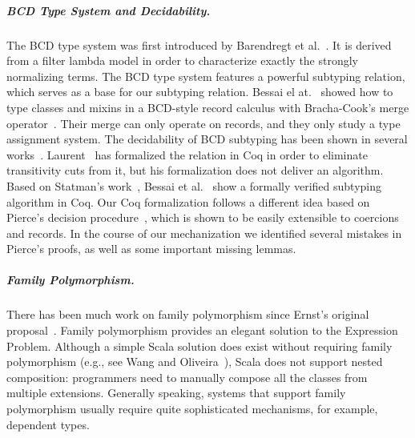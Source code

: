\subparagraph{BCD Type System and Decidability.}
The BCD type system was first introduced by Barendregt et al.~\cite{Barendregt_1983}. It is
derived from a filter lambda model in order to characterize exactly the strongly
normalizing terms. The BCD type system features a powerful subtyping relation,
which serves as a base for our subtyping relation. Bessai el at.~\cite{DBLP:journals/corr/BessaiDDCd15}
showed how to type classes and mixins in a BCD-style record calculus with Bracha-Cook's merge operator~\cite{bracha1990mixin}.
Their merge can only operate on records, and they only study a type assignment system.
The decidability of BCD subtyping has been shown in several
works~\cite{pierce1989decision, Kurata_1995, Rehof_2011, Statman_2015}.
Laurent~\cite{laurent2012intersection} has formalized the relation in Coq in
order to eliminate transitivity cuts from it, but his formalization does not
deliver an algorithm. Based on Statman's work~\cite{Statman_2015}, Bessai et
al.~\cite{bessaiextracting} show a formally verified subtyping algorithm in Coq.
Our Coq formalization follows a different idea based on Pierce's decision
procedure~\cite{pierce1989decision}, which is shown to be easily extensible to
coercions and records. In the course of our mechanization we identified several
mistakes in Pierce's proofs, as well as some important missing lemmas.

\subparagraph{Family Polymorphism.}
There has been much work on family polymorphism since Ernst's
original proposal~\cite{Ernst_2001}. Family polymorphism provides an elegant
solution to the Expression Problem. Although a simple Scala solution does exist without
requiring family polymorphism (e.g., see Wang and Oliveira~\cite{wang2016expression}), Scala
does not support nested composition: programmers need to manually compose
all the classes from multiple extensions. Generally speaking, systems that support
family polymorphism usually require quite sophisticated mechanisms, for example,
dependent types.


